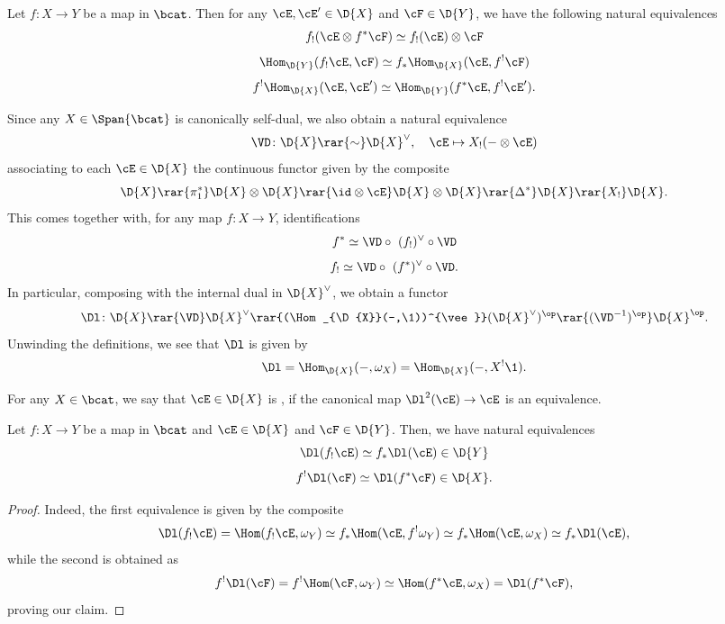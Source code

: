 \begin{prop}\label{prop: projection formula}
  Let $f\colon X\to Y$ be a map in $\bcat$. Then for any $\cE, \cE^{\prime}\in \D{X}$ and
  $\cF\in \D{Y}$, we have the following natural equivalences
  \[ f_{!}(\cE \otimes f^{\ast}\cF) \simeq f_{!}(\cE)\otimes \cF\]
  \[\Hom_{\D{Y}}(f_{!}\cE, \cF)\simeq f_{\ast}\Hom_{\D{X}}(\cE, f^{!}\cF) \]
  \[ f^{!}\Hom_{\D{X}}(\cE, \cE^{\prime})\simeq \Hom_{\D{Y}}(f^{\ast}\cE, f^{!}\cE^{\prime} ).\]
\end{prop}
\begin{cons}
  Since any $X\in \Span{\bcat}$ is canonically self-dual, we also obtain a natural
  equivalence
  \[ \VD \colon \D{X} \rar{\sim} \D{X}^{\vee}, \quad \cE \mapsto X_{!}(- \otimes \cE)\] associating to
  each $\cE\in \D{X}$ the continuous functor given by the composite
  \[ \D{X} \rar{\pi_{1}^{\ast}} \D{X} \otimes \D{X} \rar{ \id \otimes \cE } \D{X} \otimes \D{X} \rar{\Delta^{\ast}} \D{X} \rar{X_{!}} \D{X}.\]
  This comes together with, for any map $f\colon X\to Y$, identifications
  \[ f^{\ast} \simeq \VD\circ~(f_{!})^{\vee}\circ \VD \]
  \[ f_{!} \simeq \VD \circ~(f^{\ast})^{\vee}\circ \VD.\] In particular, composing with the
  internal dual in $\D{X}^{\vee}$, we obtain a functor
  \[ \Dl\colon \D{X} \rar{\VD} \D{X}^{\vee} \rar{(\Hom_{\D{X}}(-,\1))^{\vee}} (\D{X}^{\vee})^{\op} \rar{ (\VD^{-1})^{\op}} \D{X}^{\op}.\]
  Unwinding the definitions, we see that $\Dl$ is given by
  \[ \Dl = \Hom_{\D{X}}(-, \omega_{X}) = \Hom_{\D{X}}(-, X^{!}\1). \]
\end{cons}

\begin{defn}
  For any $X\in \bcat$, we say that $\cE\in \D{X}$ is , if the
  canonical map $\Dl^{2}(\cE) \to \cE$ is an equivalence.
\end{defn}

\begin{lem}\label{lem:push pull dual}
  Let $f\colon X\to Y$ be a map in $\bcat$ and $\cE\in \D{X}$ and $\cF\in \D{Y}$. Then, we
  have natural equivalences
  \[ \Dl(f_{!}\cE)\simeq f_{\ast}\Dl(\cE) \in \D{Y}\]
  \[ f^{!}\Dl(\cF) \simeq \Dl(f^{\ast}\cF) \in \D{X}.\]
\end{lem}
\begin{proof}
  Indeed, the first equivalence is given by the composite
  \[ \Dl (f_{!}\cE) = \Hom(f_{!}\cE, \omega_{Y}) \simeq f_{\ast}\Hom(\cE, f^{!}\omega_{Y}) \simeq f_{\ast}\Hom(\cE, \omega_{X}) \simeq f_{\ast}\Dl(\cE), \]
  while the second is obtained as
  \[ f^{!}\Dl(\cF)= f^{!}\Hom(\cF, \omega_{Y}) \simeq \Hom(f^{\ast}\cE, \omega_{X}) =\Dl(f^{\ast}\cF),\]
  proving our claim.
\end{proof}

